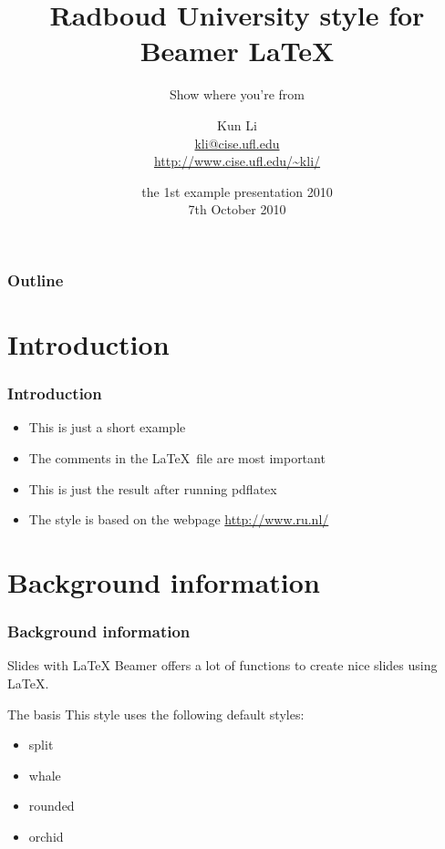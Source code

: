 \documentclass{beamer}
\title[RU style for Beamer]{
  Radboud University style for Beamer \LaTeX}
\subtitle{Show where you're from}
\author[Kun Li]{
  Kun Li \\\medskip
  {\small \url{kli@cise.ufl.edu}} \\ 
  {\small \url{http://www.cise.ufl.edu/~kli/}}}
\institute[University of Florida]{
  Department of Computer \& Information Science \& Engineering\\
  University of Florida}
\date[slides Example 2010]{
  the 1st example presentation 2010 \\
  7th October 2010}
\begin{document}
\begin{frame}
  \titlepage
\end{frame}

\begin{frame}
  \frametitle{Outline}

  \tableofcontents
\end{frame}

\section{Introduction}

\begin{frame}
  \frametitle{Introduction}

  \begin{itemize}
    \item This is just a short example
    \item The comments in the \LaTeX\ file are most important
    \item This is just the result after running pdflatex
    \item The style is based on the webpage \url{http://www.ru.nl/}
  \end{itemize}
\end{frame}

\section{Background information}

\begin{frame}
  \frametitle{Background information}

  \begin{block}{Slides with \LaTeX}
    Beamer offers a lot of functions to create nice slides using \LaTeX.
  \end{block}

  \begin{block}{The basis}
    This style uses the following default styles:
    \begin{itemize}
      \item split
      \item whale
      \item rounded
      \item orchid
    \end{itemize}
  \end{block}
\end{frame}
\end{document}
